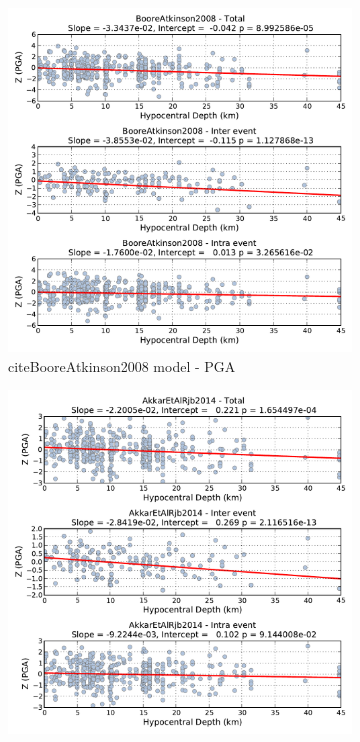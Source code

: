 \begin{figure}[htb]
  \centering
  \begin{subfigure}[b]{0.49\textwidth}
      \includegraphics[width=\textwidth]{./figures/residuals/BA2008_HypoDepth_PGA.pdf}
      \caption{citeBooreAtkinson2008 model - PGA}
      \label{fig:pga_depth_ba2008}
  \end{subfigure}
    \begin{subfigure}[b]{0.49\textwidth}
      \includegraphics[width=\textwidth]{./figures/residuals/Akkar2014_HypoDepth_PGA.pdf}

\end{subfigure}
\end{figure}
